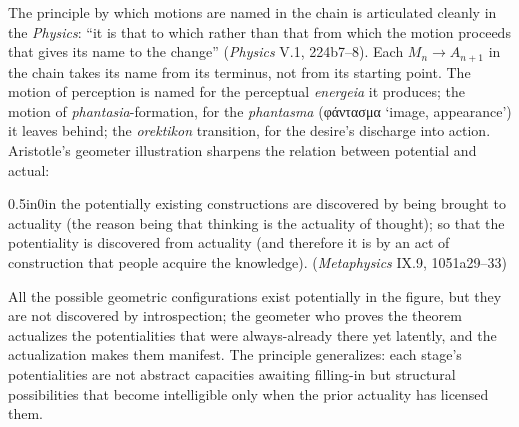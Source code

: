\documentclass{article}
\newcommand{\gk}[1]{{\greekfont #1}}
\begin{document}
The principle by which motions are named in the chain is articulated cleanly in the \textit{Physics}: ``it is that to which rather than that from which the motion proceeds that gives its name to the change'' (\textit{Physics} V.1, 224b7--8). Each $M_n \rightarrow A_{n+1}$ in the chain takes its name from its terminus, not from its starting point. The motion of perception is named for the perceptual \textit{energeia} it produces; the motion of \textit{phantasia}-formation, for the \textit{phantasma} (\gk{φάντασμα} `image, appearance') it leaves behind; the \textit{orektikon} transition, for the desire's discharge into action. Aristotle's geometer illustration sharpens the relation between potential and actual:
\begin{adjustwidth}{0.5in}{0in}
the potentially existing constructions are discovered by being brought to actuality (the reason being that thinking is the actuality of thought); so that the potentiality is discovered from actuality (and therefore it is by an act of construction that people acquire the knowledge). (\textit{Metaphysics} IX.9, 1051a29--33)
\end{adjustwidth}
All the possible geometric configurations exist potentially in the figure, but they are not discovered by introspection; the geometer who proves the theorem actualizes the potentialities that were always-already there yet latently, and the actualization makes them manifest. The principle generalizes: each stage's potentialities are not abstract capacities awaiting filling-in but structural possibilities that become intelligible only when the prior actuality has licensed them.
\end{document}
